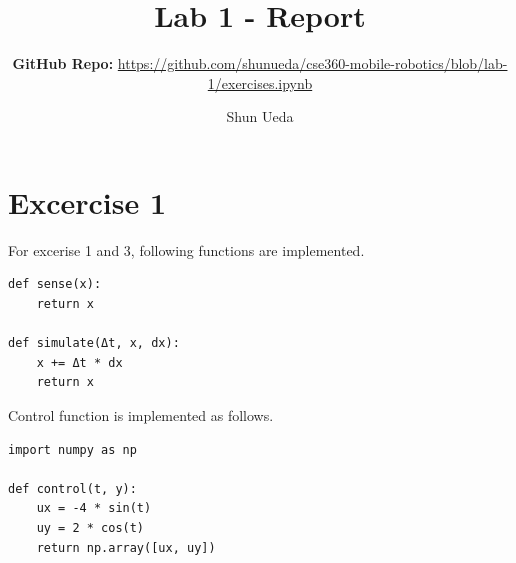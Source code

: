 \documentclass[letterpaper, 10 pt, conference]{ieeeconf}  %
\title{\LARGE \bf Lab 1 - Report}
\author{Shun Ueda}
\begin{document}
    \maketitle
    \thispagestyle{empty}
    \pagestyle{empty}

    \subtitle{\textbf{GitHub Repo:} \url{https://github.com/shunueda/cse360-mobile-robotics/blob/lab-1/exercises.ipynb}}

    \section{Excercise 1}
    For excerise 1 and 3, following functions are implemented.

    \begin{lstlisting}[label={lst:lstlisting}]
def sense(x):
    return x

def simulate(Δt, x, dx):
    x += Δt * dx
    return x
    \end{lstlisting}

    Control function is implemented as follows.

    \begin{lstlisting}[label={lst:lstlisting1}]
import numpy as np

def control(t, y):
    ux = -4 * sin(t)
    uy = 2 * cos(t)
    return np.array([ux, uy])
    \end{lstlisting}
\end{document}
